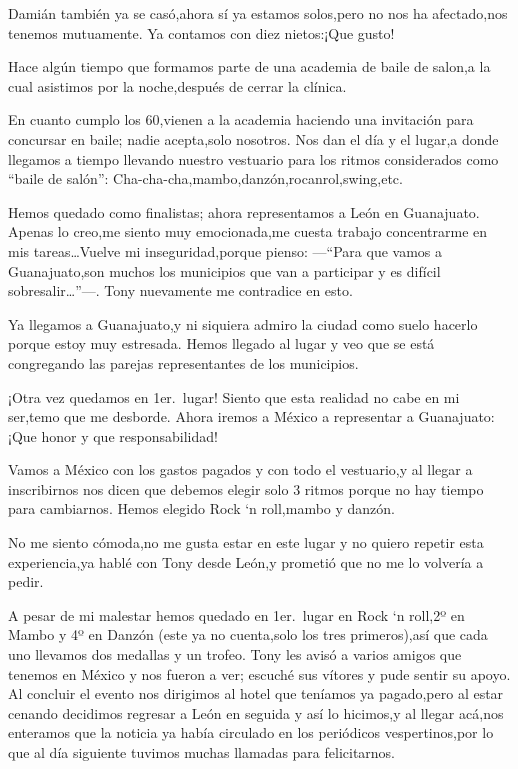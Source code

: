 \documentclass[letterpaper,12pt]{book}
\begin{document}
Damián también ya se casó,ahora sí ya estamos solos,pero no nos ha afectado,nos tenemos mutuamente. Ya contamos con diez nietos:¡Que gusto!  

Hace algún tiempo que formamos parte de una academia de baile de salon,a la cual asistimos por la noche,después de cerrar la clínica.

En cuanto cumplo los 60,vienen a la academia haciendo una invitación para concursar en baile; nadie acepta,solo nosotros. Nos dan el día y el lugar,a donde llegamos a tiempo llevando nuestro vestuario para los ritmos considerados como ``baile de salón'': Cha-cha-cha,mambo,danzón,rocanrol,swing,etc.

Hemos quedado como finalistas; ahora representamos a León en Guanajuato.  Apenas lo creo,me siento muy emocionada,me cuesta trabajo concentrarme en mis tareas\ldots Vuelve mi inseguridad,porque pienso: ---``Para que vamos a Guanajuato,son muchos los municipios que van a participar y es difícil sobresalir\ldots''---. Tony nuevamente me contradice en esto. 

Ya llegamos a Guanajuato,y ni siquiera admiro la ciudad como suelo hacerlo porque estoy muy estresada. Hemos llegado al lugar y veo que se está congregando las parejas representantes de los municipios.

¡Otra vez quedamos en 1er.\ lugar! Siento que esta realidad no cabe en mi ser,temo que me desborde. Ahora iremos a México a representar a Guanajuato: ¡Que honor y que responsabilidad!

Vamos a México con los gastos pagados y con todo el vestuario,y al llegar a inscribirnos nos dicen que debemos elegir solo 3 ritmos porque no hay tiempo para cambiarnos. Hemos elegido Rock `n roll,mambo y danzón.

No me siento cómoda,no me gusta estar en este lugar y no quiero repetir esta experiencia,ya hablé con Tony desde León,y prometió que no me lo volvería a pedir. 

A pesar de mi malestar hemos quedado en 1er.\ lugar en Rock `n roll,2º en Mambo y 4º en Danzón (este ya no cuenta,solo los tres primeros),así que cada uno llevamos dos medallas y un trofeo. Tony les avisó a varios amigos que tenemos en México y nos fueron a ver; escuché sus vítores y pude sentir su apoyo. Al concluir el evento nos dirigimos al hotel que teníamos ya pagado,pero al estar cenando decidimos regresar a León en seguida y así lo hicimos,y al llegar acá,nos enteramos que la noticia ya había circulado en los periódicos vespertinos,por lo que al día siguiente tuvimos muchas llamadas para felicitarnos.
\end{document}
